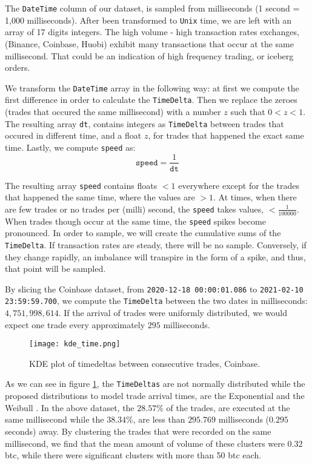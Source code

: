The \texttt{DateTime} column of our dataset, is sampled from milliseconds (1 second = 1,000 milliseconds). After been transformed to \texttt{Unix} time, we are left with an array of 17 digits integers. The high volume - high transaction rates exchanges, (Binance, Coinbase, Huobi) exhibit many transactions that occur at the same millisecond. That could be an indication of high frequency trading, or iceberg orders. 

We transform the \texttt{DateTime} array in the following way: at first we compute the first difference in order to calculate the \texttt{TimeDelta}. Then we replace the zeroes (trades that occured the same millisecond) with a number \(z\) such that \( 0 < z < 1 \). The resulting array \texttt{dt}, contains integers as \texttt{TimeDelta} between trades that occured in different time, and a float \(z\), for trades that happened the exact same time. Lastly, we compute \texttt{speed} as:
\[ \texttt{speed} = \frac{1}{\texttt{dt}} \] 

The resulting array \texttt{speed} contains floats \( < 1 \) everywhere except for the trades that happened the same time, where the values are \( > 1 \). At times, when there are few trades or no trades per (milli) second, the \texttt{speed} takes values, \( < \frac{1}{100000} \). When trades though occur at the same time, the \texttt{speed} spikes become pronounced. In order to sample, we will create the cumulative sums of the \texttt{TimeDelta}. If transaction rates are steady, there will be no sample. Conversely, if they change rapidly, an imbalance will transpire in the form of a spike, and thus, that point will be sampled.

By slicing the Coinbase dataset, from \texttt{2020-12-18 00:00:01.086} to \texttt{2021-02-10 23:59:59.700}, we compute the \texttt{TimeDelta} between the two dates in milliseconds: \( 4,751,998,614 \). If the arrival of trades were uniformly distributed, we would expect one trade every approximately \( 295 \) milliseconds.

\begin{figure}[H]
	\centering
    \texttt{[image: kde\_time.png]}
	\caption{KDE plot of timedeltas between consecutive trades, Coinbase.}
    \label{fig:kde_time}
\end{figure}

As we can see in figure \ref{fig:kde_time}, the \texttt{TimeDeltas} are not normally distributed while the proposed distributions to model trade arrival times, are the Exponential and the Weibull \cite{weib}. In the above dataset, the \(28.57\%\) of the trades, are executed at the same millisecond while the \(38.34\%\), are less than \(295.769\) milliseconds (\(0.295\) seconds) away. By clustering the trades that were recorded on the same millisecond, we find that the mean amount of volume of these clusters were \( 0.32 \) btc, while there were significant clusters with more than 50 btc each.

